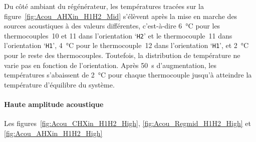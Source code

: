 %    

Du côté ambiant du régénérateur, les températures tracées sur la figure~\ref{fig:Acou_AHXin_H1H2_Mid} s'élèvent après la mise en marche des sources acoustiques à des valeurs différentes, c'est-à-dire \qty{6}{\degreeCelsius} pour les thermocouples~10 et 11 dans l'orientation `\texttt{H2}' et le thermocouple~11 dans l'orientation `\texttt{H1}', \qty{4}{\degreeCelsius} pour le thermocouple~12 dans l'orientation `\texttt{H1}', et \qty{2}{\degreeCelsius} pour le reste des thermocouples. Toutefois, la distribution de température ne varie pas en fonction de l'orientation. Après \qty{50}{\second} d'augmentation, les températures s'abaissent de \qty{2}{\degreeCelsius} pour chaque thermocouple jusqu'à atteindre la température d'équilibre du système.

%    


\paragraph*{Haute amplitude acoustique}
Les figures~\ref{fig:Acou_CHXin_H1H2_High}, \ref{fig:Acou_Regmid_H1H2_High} et \ref{fig:Acou_AHXin_H1H2_High}

